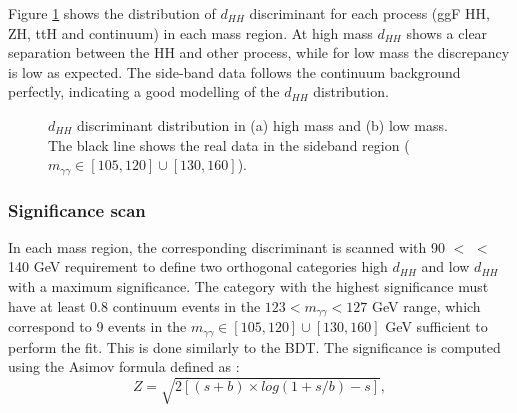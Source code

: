 Figure \ref{fig:HHyybb:ObjEvt:DNN:dHH} shows the distribution of $d_{HH}$ discriminant for each process (ggF HH, ZH, ttH and continuum) in each mass region. At high mass $d_{HH}$ shows a clear separation between the HH and other process, while for low mass the discrepancy is low as expected. The side-band data follows the continuum background perfectly, indicating a good modelling of the $d_{HH}$ distribution. 
\begin{figure}[htbp]
    \centering
    \begin{tcolorbox}[colback=black!5!white,colframe=white!75!black]
    \caption{$d_{HH}$ discriminant distribution in (a) high mass and (b) low mass. The black line shows the real data in the sideband region ($m_{\gamma\gamma}\in[105,120] \cup [130,160]$).}
    \label{fig:HHyybb:ObjEvt:DNN:dHH}
    \end{tcolorbox}
    
\end{figure}

\subsubsection{Significance scan}
In each mass region, the corresponding discriminant is scanned with 90 $<$ \mbb $<$ 140 GeV requirement to define two orthogonal categories high $d_{HH}$ and low $d_{HH}$ with a maximum significance. The category with the highest significance must have at least 0.8 continuum events in the $123<m_{\gamma\gamma}<127$ GeV range, which correspond to 9 events in the $m_{\gamma\gamma}\in[105,120] \cup [130,160]$ GeV sufficient to perform the \myy fit. This is done similarly to the BDT. The significance is computed using the Asimov formula \cite{Z} defined as : 
\begin{equation}
    Z = \sqrt{2\left[(s+b)\times log(1+s/b)-s\right]},
\end{equation}

